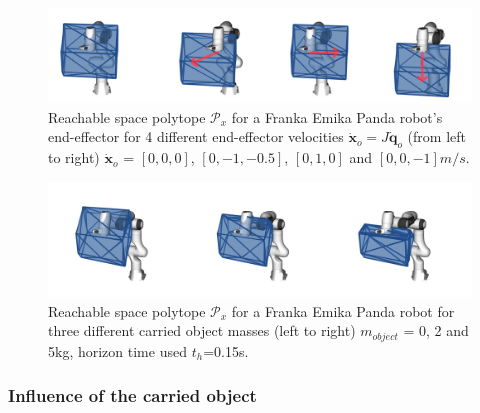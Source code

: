     

\begin{figure}[!h]
    \centering
    \includegraphics[width=\linewidth]{Papers/images/vel.png}
    \caption{Reachable space polytope $\mathcal{P}_x$ for a Franka Emika Panda robot's end-effector for 4 different end-effector velocities $\dot{\bm{x}}_o\!=\!J\dot{\bm{q}}_o$ (from left to right) $\dot{\bm{x}}_o$ = $[0,0,0]$, $[0,-1,-0.5]$, $[0,1,0] $ and $[0,0,-1]m/s$.}
    \label{fig:velocity}
\end{figure}

\begin{figure}[!h]
    \centering
    \includegraphics[width=\linewidth]{Papers/images/object.png}
    \caption{Reachable space polytope $\mathcal{P}_x$ for a Franka Emika Panda robot for three different carried object masses (left to right) $m_{object}$ = 0, 2 and 5kg, horizon time used $t_h$=0.15s.}
    \label{fig:objectt}
\end{figure}

\subsubsection{Influence of the carried object}

